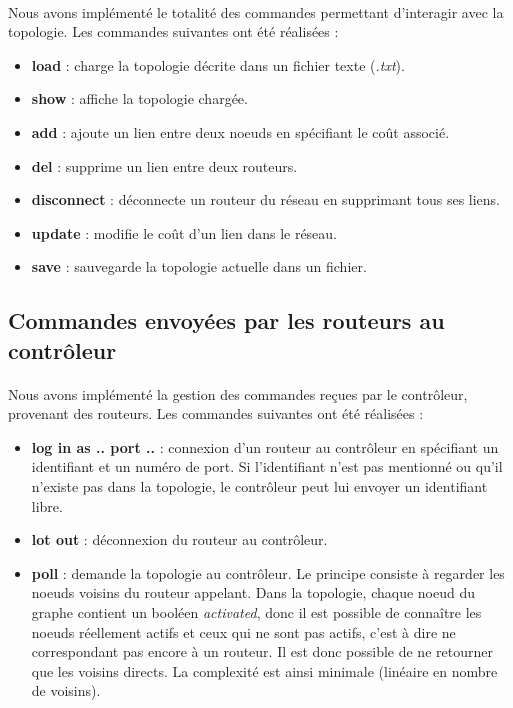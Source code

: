 \paragraph{}Nous avons implémenté le totalité des commandes permettant d'interagir avec la topologie. Les commandes suivantes ont été réalisées :
	    \begin{itemize}
		    \item \textbf{load}    : charge la topologie décrite dans un fichier texte (\textit{.txt}).
		    \item \textbf{show}     : affiche la topologie chargée.
		    \item \textbf{add} : ajoute un lien entre deux noeuds en spécifiant le coût associé.
		    \item \textbf{del}  : supprime un lien entre deux routeurs.
		    \item \textbf{disconnect} : déconnecte un routeur du réseau en supprimant tous ses liens.
\item \textbf{update} : modifie le coût d'un lien dans le réseau.
\item \textbf{save} : sauvegarde la topologie actuelle dans un fichier.
	    \end{itemize}
\subsection{Commandes envoyées par les routeurs au contrôleur}
\paragraph{}Nous avons implémenté la gestion des commandes reçues par le contrôleur, provenant des routeurs. Les commandes suivantes ont été réalisées :
	    \begin{itemize}
		    \item \textbf{log in as .. port ..}    : connexion d'un routeur au contrôleur en spécifiant un identifiant et un numéro de port. Si l'identifiant n'est pas mentionné ou qu'il n'existe pas dans la topologie, le contrôleur peut lui envoyer un identifiant libre.
		    \item \textbf{lot out}     : déconnexion du routeur au contrôleur.
\item \textbf{poll} : demande la topologie au contrôleur. Le principe consiste à regarder les noeuds voisins du routeur appelant. Dans la topologie, chaque noeud du graphe contient un booléen \textit{activated}, donc il est possible de connaître les noeuds réellement actifs et ceux qui ne sont pas actifs, c'est à dire ne correspondant pas encore à un routeur. Il est donc possible de ne retourner que les voisins directs. La complexité est ainsi minimale (linéaire en nombre de voisins).
	    \end{itemize}

